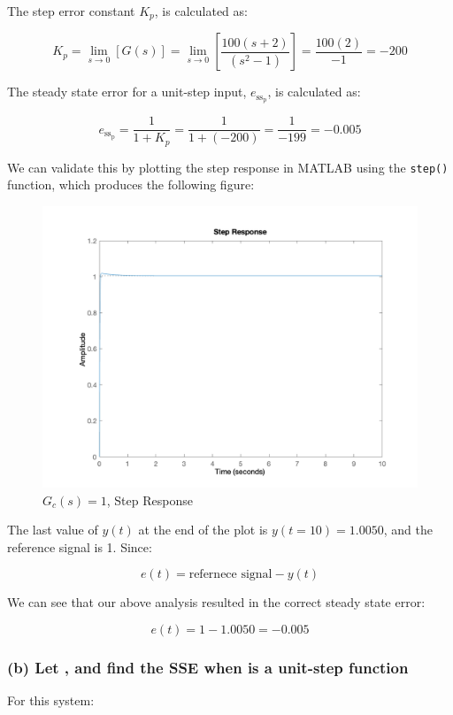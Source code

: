 \documentclass[12pt, letterpaper]{../assignment}
\begin{document}
The step error constant $K_p$, is calculated as:

$$ K_p = \lim_{s \to 0} \left[ G(s) \right]
       = \lim_{s \to 0} \left[ \frac{100(s+2)}{(s^2 -1)} \right]
       = \frac{100(2)}{-1}
       = -200 $$

The steady state error for a unit-step input, ${e_{\text{ss}_\text{p}}}$, is calculated as:

\begin{answer}
$$ {e_{\text{ss}_\text{p}}} = \frac{1}{1 + K_p} = \frac{1}{1 + (-200)} = \frac{1}{-199} = -0.005 $$
\end{answer}

We can validate this by plotting the step response in MATLAB using the \texttt{step()} function,
which produces the following figure:

\begin{figure}[H]
    \centering
    \includegraphics[width=0.7\linewidth]{./figures/Q2a_plot.png}
    \caption{$G_c (s) = 1$, Step Response}
    \label{fig:q2a_step}
\end{figure}

The last value of $y(t)$ at the end of the plot is $y(t=10) = 1.0050$, and the reference signal is 1.
Since:

$$ e(t) = \text{refernece signal} - y(t) $$

We can see that our above analysis resulted in the correct steady state error:

$$ e(t) = 1 - 1.0050 = -0.005 $$ 

\subsubsection*{(b) Let , and find the SSE when  is a unit-step function}

For this system:
\end{document}
